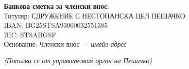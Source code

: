 \documentclass[12pt,a4paper]{article}
\begin{document}
\begin{Form}
\noindent
{}

\vspace{1cm}

\noindent
\textbf{Банкова сметка за членски внос}: \\
Титуляр: СДРУЖЕНИЕ С НЕСТОПАНСКА ЦЕЛ ПЕШАЧКО \\
IBAN: BG25STSA93000032551385 \\
BIC: STSABGSF \\
Основание: Членски внос — \textit{имейл адрес}

\vspace{0.5cm}

\noindent
\hrulefill

\begin{center}
    \textit{(Попълва се от управителния орган на Пешачко)}
\end{center}

\vspace{0.5cm}

\noindent
{}

\vspace{0.5cm}

\noindent
{}

\vspace{0.5cm}

\noindent
{}

\end{Form}
\end{document}
